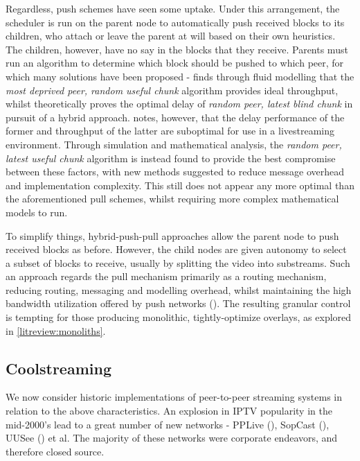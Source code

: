 \documentclass[12pt,a4paper]{article}
\begin{document}
Regardless, push schemes have seen some uptake. Under this arrangement, the scheduler is run on the parent node to automatically push received blocks to its children, who attach or leave the parent at will based on their own heuristics. The children, however, have no say in the blocks that they receive. Parents must run an algorithm to determine which block should be pushed to which peer, for which many solutions have been proposed - \cite{Massoulie2007} finds through fluid modelling that the \textit{most deprived peer, random useful chunk} algorithm provides ideal throughput, whilst \cite{Sanghavi2006} theoretically proves the optimal delay of \textit{random peer, latest blind chunk} in pursuit of a hybrid approach. \cite{Bonald2008} notes, however, that the delay performance of the former and throughput of the latter are suboptimal for use in a livestreaming environment. Through simulation and mathematical analysis, the \textit{random peer, latest useful chunk} algorithm is instead found to provide the best compromise between these factors, with new methods suggested to reduce message overhead and implementation complexity. This still does not appear any more optimal than the aforementioned pull schemes, whilst requiring more complex mathematical models to run.

To simplify things, hybrid-push-pull approaches allow the parent node to push received blocks as before. However, the child nodes are given autonomy to select a subset of blocks to receive, usually by splitting the video into substreams. Such an approach regards the pull mechanism primarily as a routing mechanism, reducing routing, messaging and modelling overhead, whilst maintaining the high bandwidth utilization offered by push networks (\cite{Zhang2007}). The resulting granular control is tempting for those producing monolithic, tightly-optimize overlays, as explored in \ref{litreview:monoliths}.

\subsection{Coolstreaming} \label{litreview:coolstreaming}
We now consider historic implementations of peer-to-peer streaming systems in relation to the above characteristics. An explosion in IPTV popularity in the mid-2000's lead to a great number of new networks - PPLive (\cite{PPLive}), SopCast (\cite{SopCast2019}), UUSee (\cite{UUSee2007}) et al. The majority of these networks were corporate endeavors, and therefore closed source.
\end{document}

